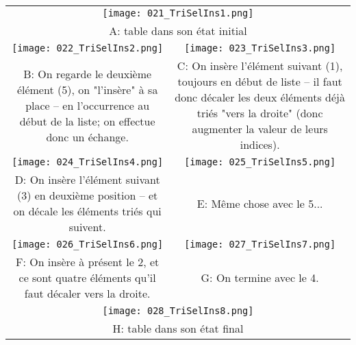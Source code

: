 \documentclass[12pt]{article}
\begin{document}
	\begin{center}
		\begin{tabular}{c c}
			\multicolumn{2}{c}{\texttt{[image: 021\_TriSelIns1.png]}} \\
			\multicolumn{2}{c}{\parbox{0.5\textwidth}{\centering A: table dans son état initial}} \\
			\texttt{[image: 022\_TriSelIns2.png]} & \texttt{[image: 023\_TriSelIns3.png]} \\
			\begin{minipage}{0.5\textwidth}
				B: On regarde le deuxième élément (5), on "l'insère" à sa place -- en l'occurrence au début de la liste; on effectue donc un échange.
			\end{minipage} & 
			\begin{minipage}{0.5\textwidth}
				C: On insère l'élément suivant (1), toujours en début de liste -- il faut donc décaler les deux éléments déjà triés "vers la droite" (donc augmenter la valeur de leurs indices).
			\end{minipage} \\
			\texttt{[image: 024\_TriSelIns4.png]} & \texttt{[image: 025\_TriSelIns5.png]} \\
			\begin{minipage}{0.5\textwidth}
				D: On insère l'élément suivant (3) en deuxième position -- et on décale les éléments triés qui suivent.
			\end{minipage} & 
			\begin{minipage}{0.5\textwidth}
				E: Même chose avec le 5...
			\end{minipage} \\
			\texttt{[image: 026\_TriSelIns6.png]} & \texttt{[image: 027\_TriSelIns7.png]} \\
			\begin{minipage}{0.5\textwidth}
				F: On insère à présent le 2, et ce sont quatre éléments qu'il faut décaler vers la droite.
			\end{minipage} & 
			\begin{minipage}{0.5\textwidth}
				G: On termine avec le 4.
			\end{minipage} \\
			\multicolumn{2}{c}{\texttt{[image: 028\_TriSelIns8.png]}} \\
			\multicolumn{2}{c}{\parbox{0.5\textwidth}{\centering H: table dans son état final}} \\
		\end{tabular}
	\end{center}
	
\end{document}
